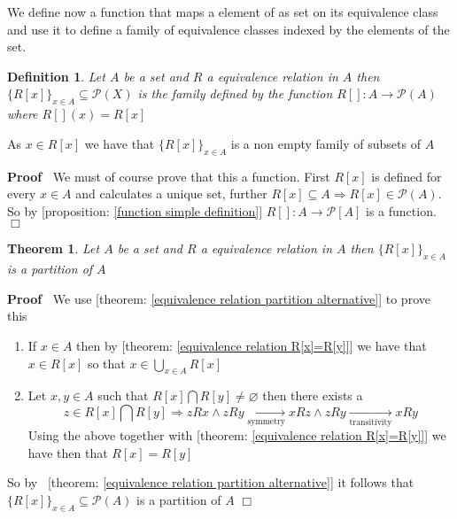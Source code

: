 \documentclass{book}
\newcommand{\Rightarrowlim}{\mathop{\rightarrow}\limits}
\newcommand{\tmop}[1]{\ensuremath{\operatorname{#1}}}
\newenvironment{proof}{\noindent\textbf{Proof\ }}{\hspace*{\fill}$\Box$\medskip}
\newtheorem{definition}{Definition}
{\theorembodyfont{\rmfamily}\newtheorem{example}{Example}}
\newtheorem{theorem}{Theorem}
\begin{document}
We define now a function that maps a element of as set on its equivalence
class and use it to define a family of equivalence classes indexed by the
elements of the set.

\begin{definition}
  Let $A$ be a set and $R$ a equivalence relation in $A$ then $\{ R [x] \}_{x
  \in A} \subseteq \mathcal{P} (X)$ is the family defined by the function $R
  [] : A \rightarrow \mathcal{P} (A)$ where $R [] (x) = R [x]$
\end{definition}

\begin{note}
  As $x \in R [x]$ we have that $\{ R [x] \}_{x \in A}$ is a non empty family
  of subsets of $A$
\end{note}

\begin{proof}
  We must of course prove that this a function. First $R [x]$ is defined for
  every $x \in A$ and calculates a unique set, further $R [x] \subseteq A
  \Rightarrow R [x] \in \mathcal{P} (A)$. So by [proposition: \ref{function
  simple definition}] $R [] : A \rightarrow \mathcal{P} [A]$ is a function.
\end{proof}

\begin{theorem}
  \label{equivalence relation defines a partition}Let $A$ be a set and $R$ a
  equivalence relation in $A$ then $\{ R [x] \}_{x \in A}$ is a partition of
  $A$
\end{theorem}

\begin{proof}
  We use [theorem: \ref{equivalence relation partition alternative}] to prove
  this
  \begin{enumerate}
    \item If $x \in A$ then by [theorem: \ref{equivalence relation R[x]=R[y]}]
    we have that $x \in R [x]$ so that $x \in \bigcup_{x \in A} R [x]$
    
    \item Let $x, y \in A$ such that $R [x] \bigcap R [y] \neq \varnothing$
    then there exists a
    \[ z \in R [x] \bigcap R [y] \Rightarrow z R x \wedge z R y
       \Rightarrowlim_{\tmop{symmetry}} x R z \wedge z R y
       \Rightarrowlim_{\tmop{transitivity}} x R y \]
    Using the above together with [theorem: \ref{equivalence relation
    R[x]=R[y]}] we have then that $R [x] = R [y]$
  \end{enumerate}
  So by \ [theorem: \ref{equivalence relation partition alternative}] it
  follows that $\{ R [x] \}_{x \in A} \subseteq \mathcal{P} (A)$ is a
  partition of $A$
\end{proof}
\end{document}
